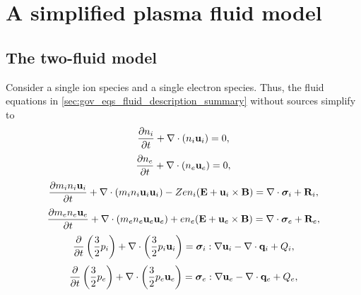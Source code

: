 \documentclass[a4paper,11pt]{report}
\begin{document}
\chapter{A simplified plasma fluid model}
\section{The two-fluid model}
\label{sec:2fluid_equations}
Consider a single ion species and a single electron species. Thus, the fluid equations in \ref{sec:gov_eqs_fluid_description_summary} without sources simplify to
\begin{equation}
    \label{eq:mf_2fluid_ni}
    \frac{\partial n_i}{\partial t} + \nabla \cdot \left ( n_i \mathbf{u}_i \right ) = 0,
\end{equation}
\begin{equation}
    \label{eq:mf_2fluid_ne}
    \frac{\partial n_e}{\partial t} + \nabla \cdot \left ( n_e \mathbf{u}_e \right ) = 0,
\end{equation}
\begin{equation}
    \label{eq:mf_2fluid_ui}
    \frac{\partial m_i n_i \mathbf{u}_i}{\partial t} + \nabla \cdot \left ( m_i n_i \mathbf{u}_i \mathbf{u}_i \right) - Z e n_i ( \mathbf{E} + \mathbf{u}_i \times \mathbf{B} ) = \nabla \cdot \bm \sigma_i + \mathbf{R}_i,
\end{equation}
\begin{equation}
    \label{eq:mf_2fluid_ue}
    \frac{\partial m_e n_e \mathbf{u}_e}{\partial t} + \nabla \cdot \left ( m_e n_e \mathbf{u}_e \mathbf{u}_e \right) + e n_e ( \mathbf{E} + \mathbf{u}_e \times \mathbf{B} ) = \nabla \cdot \bm \sigma_e + \mathbf{R}_e,
\end{equation}
\begin{equation}
    \label{eq:mf_2fluid_iei}
    \frac{\partial}{\partial t} \left ( \frac{3}{2} p_i \right ) + \nabla \cdot \left ( \frac{3}{2} p_i \mathbf{u}_i \right ) = \bm \sigma_i : \nabla \mathbf{u}_i - \nabla \cdot \mathbf{q}_i + Q_i,
\end{equation}
\begin{equation}
    \label{eq:mf_2fluid_iee}
    \frac{\partial}{\partial t} \left ( \frac{3}{2} p_e \right ) + \nabla \cdot \left ( \frac{3}{2} p_e \mathbf{u}_e \right ) = \bm \sigma_e : \nabla \mathbf{u}_e - \nabla \cdot \mathbf{q}_e + Q_e,
\end{equation}
\end{document}
